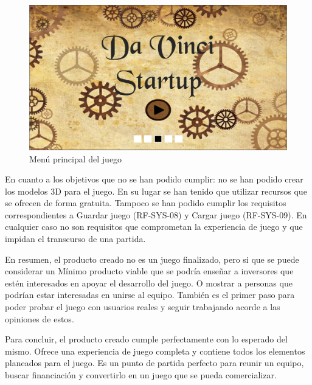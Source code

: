 \begin{figure}[H]
\begin{center}
\includegraphics[scale=0.5]{imagenes/titulo.png}
\caption{Menú principal del juego}
\label{titulo}
\end{center}
\end{figure}

En cuanto a los objetivos que no se han podido cumplir: no se han podido crear los modelos 3D para el juego. En su lugar se han tenido que utilizar recursos que se ofrecen de forma gratuita. Tampoco se han podido cumplir los requisitos correspondientes a Guardar juego (RF-SYS-08) y Cargar juego (RF-SYS-09). En cualquier caso no son requisitos que comprometan la experiencia de juego y que impidan el transcurso de una partida. 

En resumen, el producto creado no es un juego finalizado, pero si que se puede considerar un Mínimo producto viable que se podría enseñar a inversores que estén interesados en apoyar el desarrollo del juego. O mostrar a personas que podrían estar interesadas en unirse al equipo. También es el primer paso para poder probar el juego con usuarios reales y seguir trabajando acorde a las opiniones de estos. 

Para concluir, el producto creado cumple perfectamente con lo esperado del mismo. Ofrece una experiencia de juego completa y contiene todos los elementos planeados para el juego. Es un punto de partida perfecto para reunir un equipo, buscar financiación y convertirlo en un juego que se pueda comercializar.